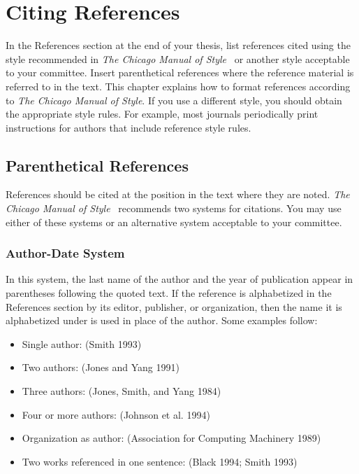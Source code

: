 \chapter{Citing References}
\label{cpt:citation}

In the References section at the end of your thesis, list references
cited using the style recommended in \textit{The Chicago Manual of
Style}~\cite{ChicagoManual} or another style acceptable to your
committee.  Insert parenthetical references where the reference
material is referred to in the text.  This chapter explains how to
format references according to \textit{The Chicago Manual of Style}.  If you
use a different style, you should obtain the appropriate style rules.
For example, most journals periodically print instructions for authors
that include reference style rules.

\section{Parenthetical References}

References should be cited at the position in the text where they are
noted.  \textit{The Chicago Manual of Style}~\cite{ChicagoManual} recommends
two systems for citations.  You may use either of these systems or an
alternative system acceptable to your committee.

\subsection{Author-Date System}

In this system, the last name of the author and the year of
publication appear in parentheses following the quoted text.  If the
reference is alphabetized in the References section by its editor,
publisher, or organization, then the name it is alphabetized under is
used in place of the author.  Some examples follow:
\begin{itemize}
 \item Single author: (Smith 1993)
 \item Two authors: (Jones and Yang 1991)
 \item Three authors: (Jones, Smith, and Yang 1984)
 \item Four or more authors: (Johnson et al. 1994)
 \item Organization as author: (Association for Computing Machinery 1989)
 \item Two works referenced in one sentence: (Black 1994; Smith 1993)
\end{itemize}

